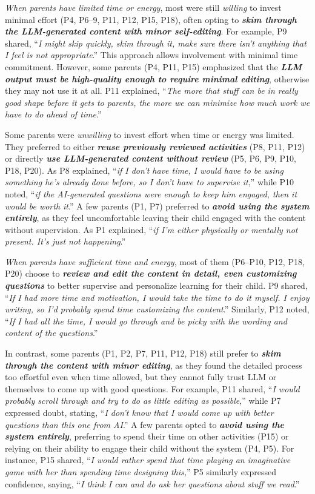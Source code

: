 \textit{When parents have limited time or energy}, most were still \textit{willing} to invest minimal effort (P4, P6--9, P11, P12, P15, P18), often opting to \textit{\textbf{skim through the LLM-generated content with minor self-editing}}. For example, P9 shared, ``\textit{I might skip quickly, skim through it, make sure there isn't anything that I feel is not appropriate}.'' This approach allows involvement with minimal time commitment. However, some parents (P4, P11, P15) emphasized that the \textit{\textbf{LLM output must be high-quality enough to require minimal editing}}, otherwise they may not use it at all. P11 explained, ``\textit{The more that stuff can be in really good shape before it gets to parents, the more we can minimize how much work we have to do ahead of time}.''

Some parents were \textit{unwilling} to invest effort when time or energy was limited. They preferred to either \textit{\textbf{reuse previously reviewed activities}} (P8, P11, P12) or directly \textit{\textbf{use LLM-generated content without review}} (P5, P6, P9, P10, P18, P20). As P8 explained, ``\textit{if I don't have time, I would have to be using something he's already done before, so I don't have to supervise it},'' while P10 noted, ``\textit{if the AI-generated questions were enough to keep him engaged, then it would be worth it}.'' A few parents (P1, P7) preferred to \textit{\textbf{avoid using the system entirely}}, as they feel uncomfortable leaving their child engaged with the content without supervision. As P1 explained, ``\textit{if I'm either physically or mentally not present. It's just not happening}.''

\textit{When parents have sufficient time and energy}, most of them (P6–P10, P12, P18, P20) choose to \textit{\textbf{review and edit the content in detail, even customizing questions}} to better supervise and personalize learning for their child. P9 shared, ``\textit{If I had more time and motivation, I would take the time to do it myself. I enjoy writing, so I'd probably spend time customizing the content}.'' Similarly, P12 noted, ``\textit{If I had all the time, I would go through and be picky with the wording and content of the questions}.''

In contrast, some parents (P1, P2, P7, P11, P12, P18) still prefer to \textit{\textbf{skim through the content with minor editing}}, as they found the detailed process too effortful even when time allowed, but they cannot fully trust LLM or themselves to come up with good questions. For example, P11 shared, ``\textit{I would probably scroll through and try to do as little editing as possible},'' while P7 expressed doubt, stating, ``\textit{I don't know that I would come up with better questions than this one from AI}.'' A few parents opted to \textit{\textbf{avoid using the system entirely}}, preferring to spend their time on other activities (P15) or relying on their ability to engage their child without the system (P4, P5). For instance, P15 shared, ``\textit{I would rather spend that time playing an imaginative game with her than spending time designing this,}'' P5 similarly expressed confidence, saying, ``\textit{I think I can and do ask her questions about stuff we read}.''

